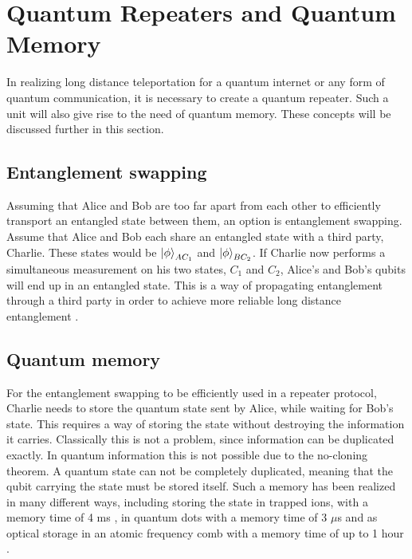 \section{Quantum Repeaters and Quantum Memory}
In realizing long distance teleportation for a quantum internet or any form of quantum communication, it is necessary to create a quantum repeater. Such a unit will also give rise to the need of quantum memory. These concepts will be discussed further in this section.

\subsection{Entanglement swapping}

Assuming that Alice and Bob are too far apart from each other to efficiently transport an entangled state between them, an option is entanglement swapping. Assume that Alice and Bob each share an entangled state with a third party, Charlie. These states would be $\ket{\phi}_{AC_1}$ and $\ket{\phi}_{BC_2}$. If Charlie now performs a simultaneous measurement on his two states, $C_1$ and $C_2$, Alice's and Bob's qubits will end up in an entangled state. This is a way of propagating entanglement through a third party in order to achieve more reliable long distance entanglement \cite{Azuma:2023}.

\subsection{Quantum memory}

For the entanglement swapping to be efficiently used in a repeater protocol, Charlie needs to store the quantum state sent by Alice, while waiting for Bob's state. This requires a way of storing the state without destroying the information it carries. Classically this is not a problem, since information can be duplicated exactly. In quantum information this is not possible due to the no-cloning theorem. A quantum state can not be completely duplicated, meaning that the qubit carrying the state must be stored itself. Such a memory has been realized in many different ways, including storing the state in trapped ions, with a memory time of 4 ms \cite{trapped_ion_memory}, in quantum dots with a memory time of 3 $\mu$s \cite{dot_memory} and as optical storage in an atomic frequency comb with a memory time of up to 1 hour \cite{1hour}.


